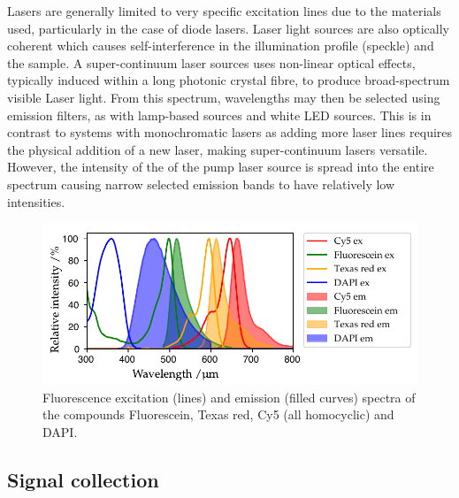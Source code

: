 \Gls{Laser}s are generally limited to very specific excitation lines due to the materials used, particularly in the case of diode lasers.
\Gls{Laser} light sources are also optically \gls{coherent} which causes self-interference in the illumination profile (speckle) and the sample.
A \gls{super-continuum laser} sources uses non-linear optical effects, typically induced within a long photonic crystal fibre, to produce broad-spectrum visible \gls{Laser} light.
From this spectrum, wavelengths may then be selected using emission filters, as with lamp-based sources and white LED sources.
This is in contrast to systems with monochromatic lasers as adding more laser lines requires the physical addition of a new laser, making \gls{super-continuum laser}s versatile.
However, the intensity of the of the pump laser source is spread into the entire spectrum causing narrow selected emission bands to have relatively low intensities.

\begin{figure}
    \centering
    \includegraphics{./fluorphores/++multi_plot.pdf}
    \caption[Common fluorescence excitation spectra]{Fluorescence excitation (lines) and emission (filled curves) spectra of the compounds Fluorescein, Texas red, Cy5 (all homocyclic) and DAPI.}\label{fig:fluo_spectra}
\end{figure}

\subsection{Signal collection}

